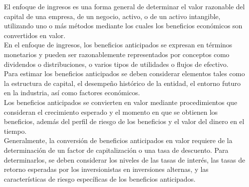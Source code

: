 El enfoque de ingresos es una forma general de determinar el valor razonable del capital de una empresa, de un negocio, activo, o de un activo intangible, utilizando uno o m\'as m\'etodos mediante los cuales los beneficios econ\'omicos son convertidos en valor.\\[10pt]

En el enfoque de ingresos, los beneficios anticipados se expresan en t\'erminos monetarios y pueden ser razonablemente representados por conceptos como dividendos o distribuciones, o varios tipos de utilidades o flujos de efectivo. \\[10pt]

Para estimar los beneficios anticipados se deben considerar elementos tales como la estructura de capital, el desempe\~no hist\'orico de la entidad, el entorno futuro en la industria, as\'i como factores econ\'omicos.\\[10pt]

Los beneficios anticipados se convierten en valor mediante procedimientos que consideran el crecimiento esperado y el momento en que se obtienen los beneficios, adem\'as del perfil de riesgo de los beneficios y el valor del dinero en el tiempo.\\[10pt]

Generalmente, la conversi\'on de beneficios anticipados en valor requiere de la determinaci\'on de un factor de capitalizaci\'on o una tasa de descuento. Para determinarlos, se deben considerar los niveles de las tasas de inter\'es, las tasas de retorno esperadas por los inversionistas en inversiones alternas, y las caracter\'isticas de riesgo espec\'ificas de los beneficios anticipados.\\